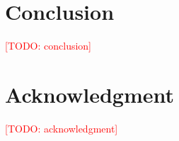\documentclass[conference]{IEEEtran}
\newcommand{\todo}[1]{\textcolor{red}{[TODO: #1]}}
\begin{document}
\section{Conclusion}
\todo{conclusion}

\section*{Acknowledgment}
\todo{acknowledgment}

\nocite{*} %


\end{document}
